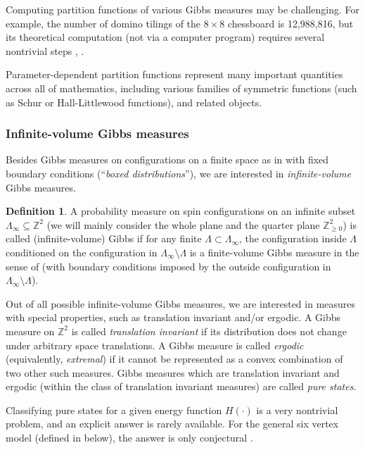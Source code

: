 \documentclass[letterpaper,11pt,oneside,reqno]{article}
\numberwithin{equation}{section}
\theoremstyle{definition}
\newtheorem{definition}[proposition]{Definition}
\begin{document}
Computing partition functions of various Gibbs measures
may be challenging. For example, the number of 
domino tilings of the $8\times 8$ chessboard is 12,988,816,
but its theoretical computation (not via a computer program)
requires several nontrivial steps \cite{Kasteleyn1961}, \cite{temperley1961dimer}. 


Parameter-dependent partition functions represent many important 
quantities across all of mathematics, including various
families of symmetric functions (such as Schur or Hall-Littlewood functions), and related objects.

\subsubsection{Infinite-volume Gibbs measures}

Besides Gibbs measures on configurations on a
finite space as in  with fixed boundary
conditions (``\emph{boxed distributions}''), we are 
interested
in \emph{infinite-volume} Gibbs measures. 

\begin{definition}
	\label{def:infinite_Gibbs}
	A probability measure on spin configurations on 
	an infinite subset $\Lambda_\infty\subseteq\mathbb{Z}^{2}$
	(we will mainly consider the whole plane and the quarter plane $\mathbb{Z}_{\ge0}^{2}$)
	is called (infinite-volume) Gibbs if for any finite $\Lambda\subset \Lambda_\infty$,
	the configuration inside $\Lambda$
	conditioned on the configuration in $\Lambda_\infty\setminus \Lambda$
	is a finite-volume Gibbs measure in the sense of 
	(with boundary conditions imposed by the outside configuration in $\Lambda_\infty\setminus \Lambda$).
\end{definition}

Out of all possible infinite-volume Gibbs measures, we are interested in measures with 
special properties, such as translation invariant and/or ergodic.
A Gibbs measure on $\mathbb{Z}^{2}$ is called \emph{translation invariant}
if its distribution does not change under arbitrary
space translations. 
A Gibbs measure is called \emph{ergodic} (equivalently, \emph{extremal})
if it cannot be represented as a convex combination of 
two other such measures.
Gibbs measures which are translation invariant
and ergodic (within the class of translation invariant measures)
are called \emph{pure states}.

Classifying pure states for a given energy function $H(\cdot)$ is a very
nontrivial problem, and an 
explicit answer is rarely available. 
For the general six vertex model 
(defined in  below),
the answer is only conjectural
\cite{reshetikhin2010lectures}.
\end{document}
